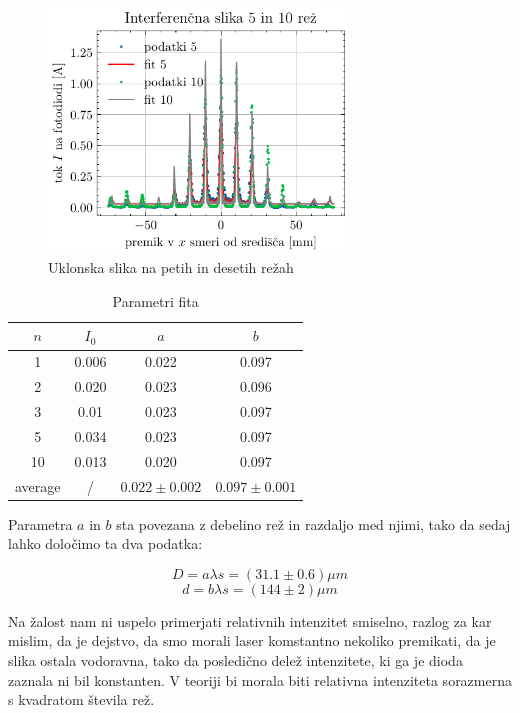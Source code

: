 \documentclass[12pt]{article}
\begin{document}
\begin{figure}[ht]
\begin{center}
    \includegraphics[width=8cm]{uklon510.pdf}
    \caption{Uklonska slika na petih in desetih režah}
    \label{5}
\end{center}
\end{figure}

\begin{table}[!ht]
\centering
\begin{tabular}{c||c|c|c}
    $n$     & $I_0$ & $a$            & $b$              \\\hline \hline
    1       & 0.006 & 0.022          & 0.097            \\
    2       & 0.020 & 0.023          & 0.096            \\
    3       & 0.01  & 0.023          & 0.097            \\
    5       & 0.034 & 0.023          & 0.097            \\
    10      & 0.013 & 0.020          & 0.097            \\\hline
    average & /     & $0.022\pm 0.002$ & $0.097\pm 0.001$
\end{tabular}
\caption{Parametri fita}
\label{params}
\end{table}

\newpage
Parametra $a$ in $b$ sta povezana z debelino rež in razdaljo med njimi, tako da sedaj lahko določimo ta dva podatka:

\begin{equation*}
    D = a \lambda s = (31.1\pm 0.6)\mu m
\end{equation*}
\begin{equation*}
    d = b \lambda s = (144\pm 2)\mu m
\end{equation*}

\noindent Na žalost nam ni uspelo primerjati relativnih intenzitet smiselno, razlog za kar mislim, da je dejstvo, da smo morali laser komstantno nekoliko premikati, da je slika ostala vodoravna, tako da posledično delež intenzitete, ki ga je dioda zaznala ni bil konstanten. V teoriji bi morala biti relativna intenziteta sorazmerna s kvadratom števila rež.
\end{document}
